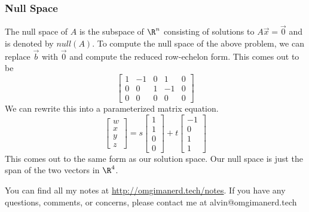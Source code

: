 \documentclass{math}
\begin{document}
\subsubsection*{Null Space}
The null space of \( A \) is the subspace of \( \R^n \) consisting of solutions
to \( A\vec{x} = \vec{0} \) and is denoted by \( null(A) \). To compute the
null space of the above problem, we can replace \( \vec{b} \) with \( \vec{0} \)
and compute the reduced row-echelon form. This comes out to be
\[ \begin{bmatrix}
  1 & -1 & 0 & 1 & 0 \\
  0 & 0 & 1 & -1 & 0 \\
  0 & 0 & 0 & 0 & 0
\end{bmatrix} \]
We can rewrite this into a parameterized matrix equation.
\[ \begin{bmatrix}w \\ x \\ y \\ z\end{bmatrix} =
  s\begin{bmatrix}1 \\ 1 \\ 0 \\ 0\end{bmatrix}+
  t\begin{bmatrix}-1 \\ 0 \\ 1 \\ 1\end{bmatrix} \]
This comes out to the same form as our solution space. Our null space is just
the span of the two vectors in \( \R^4 \).

\begin{center}
  You can find all my notes at \url{http://omgimanerd.tech/notes}. If you have
  any questions, comments, or concerns, please contact me at
  alvin@omgimanerd.tech
\end{center}
\end{document}

